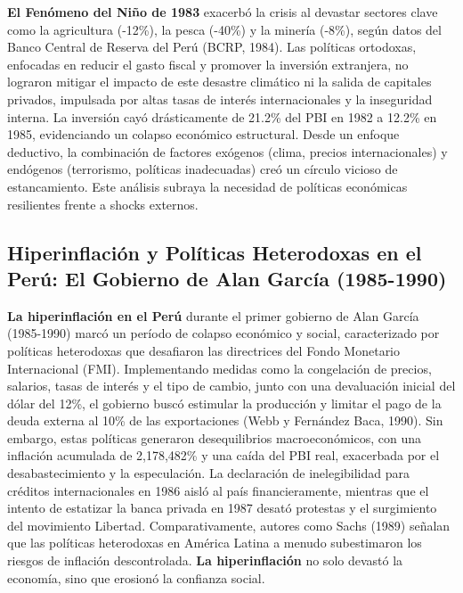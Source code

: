 \documentclass[
  jou,
  floatsintext,
  longtable,
  a4paper,
  nolmodern,
  notxfonts,
  notimes,
  12pt,
  colorlinks=true,linkcolor=blue,citecolor=blue,urlcolor=blue]{apa7}
\begin{document}
\textbf{El Fenómeno del Niño de 1983} exacerbó la crisis al devastar
sectores clave como la agricultura (-12\%), la pesca (-40\%) y la
minería (-8\%), según datos del Banco Central de Reserva del Perú (BCRP,
1984). Las políticas ortodoxas, enfocadas en reducir el gasto fiscal y
promover la inversión extranjera, no lograron mitigar el impacto de este
desastre climático ni la salida de capitales privados, impulsada por
altas tasas de interés internacionales y la inseguridad interna. La
inversión cayó drásticamente de 21.2\% del PBI en 1982 a 12.2\% en 1985,
evidenciando un colapso económico estructural. Desde un enfoque
deductivo, la combinación de factores exógenos (clima, precios
internacionales) y endógenos (terrorismo, políticas inadecuadas) creó un
círculo vicioso de estancamiento. Este análisis subraya la necesidad de
políticas económicas resilientes frente a shocks externos.

\subsection{Hiperinflación y Políticas Heterodoxas en el Perú: El
Gobierno de Alan García
(1985-1990)}\label{hiperinflaciuxf3n-y-poluxedticas-heterodoxas-en-el-peruxfa-el-gobierno-de-alan-garcuxeda-1985-1990}

\textbf{La hiperinflación en el Perú} durante el primer gobierno de Alan
García (1985-1990) marcó un período de colapso económico y social,
caracterizado por políticas heterodoxas que desafiaron las directrices
del Fondo Monetario Internacional (FMI). Implementando medidas como la
congelación de precios, salarios, tasas de interés y el tipo de cambio,
junto con una devaluación inicial del dólar del 12\%, el gobierno buscó
estimular la producción y limitar el pago de la deuda externa al 10\% de
las exportaciones (Webb y Fernández Baca, 1990). Sin embargo, estas
políticas generaron desequilibrios macroeconómicos, con una inflación
acumulada de 2,178,482\% y una caída del PBI real, exacerbada por el
desabastecimiento y la especulación. La declaración de inelegibilidad
para créditos internacionales en 1986 aisló al país financieramente,
mientras que el intento de estatizar la banca privada en 1987 desató
protestas y el surgimiento del movimiento Libertad. Comparativamente,
autores como Sachs (1989) señalan que las políticas heterodoxas en
América Latina a menudo subestimaron los riesgos de inflación
descontrolada. \textbf{La hiperinflación} no solo devastó la economía,
sino que erosionó la confianza social.
\end{document}
